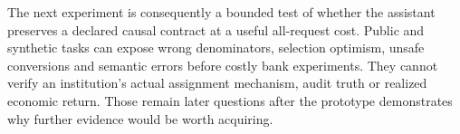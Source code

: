 The next experiment is consequently a bounded test of whether the assistant
preserves a declared causal contract at a useful all-request cost. Public and
synthetic tasks can expose wrong denominators, selection optimism, unsafe
conversions and semantic errors before costly bank experiments. They cannot
verify an institution's actual assignment mechanism, audit truth or realized
economic return. Those remain later questions after the prototype demonstrates
why further evidence would be worth acquiring.
